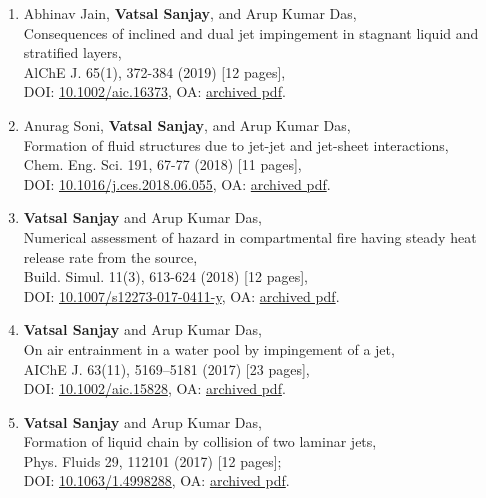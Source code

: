 \documentclass[10pt,a4paper,colorlinks,linkcolor=blue,urlcolor=blue,citecolor=blue]{moderncv}
\begin{document}
\begin{enumerate}[leftmargin=1.25em]
	\item Abhinav Jain, \textbf{Vatsal Sanjay}, and Arup Kumar Das,\\
	Consequences of inclined and dual jet impingement in stagnant liquid and stratified layers,\\
	AlChE J. 65(1), 372-384  (2019) [12 pages],\\
	DOI: \href{https://doi.org/10.1002/aic.16373}{10.1002/aic.16373}, OA: \href{https://tinyurl.com/24p5dy8s}{archived pdf}.

	\item Anurag Soni, \textbf{Vatsal Sanjay}, and Arup Kumar Das,\\
	Formation of fluid structures due to jet-jet and jet-sheet interactions,\\
	Chem. Eng. Sci. 191, 67-77  (2018) [11 pages],\\
	DOI: \href{https://doi.org/10.1016/j.ces.2018.06.055}{10.1016/j.ces.2018.06.055}, OA: \href{https://tinyurl.com/2bv5fznd}{archived pdf}.

	\item \textbf{Vatsal Sanjay} and Arup Kumar Das,\\
	Numerical assessment of hazard in compartmental fire having steady heat release rate from the source,\\
	Build. Simul. 11(3), 613-624  (2018) [12 pages],\\
	DOI: \href{https://doi.org/10.1007/s12273-017-0411-y}{10.1007/s12273-017-0411-y}, OA: \href{https://tinyurl.com/2bwhzlzv}{archived pdf}.

	\item \textbf{Vatsal Sanjay} and Arup Kumar Das,\\
	On air entrainment in a water pool by impingement of a jet,\\
	AIChE J. 63(11), 5169--5181  (2017) [23 pages],\\
	DOI: \href{https://doi.org/10.1002/aic.15828}{10.1002/aic.15828}, OA: \href{https://tinyurl.com/24ne4oql}{archived pdf}.

	\item \textbf{Vatsal Sanjay} and Arup Kumar Das,\\
	Formation of liquid chain by collision of two laminar jets,\\
	Phys. Fluids 29, 112101  (2017) [12 pages];\\
	DOI: \href{https://doi.org/10.1063/1.4998288}{10.1063/1.4998288}, OA: \href{https://tinyurl.com/27sd7lgo}{archived pdf}.

\end{enumerate}
\end{document}

